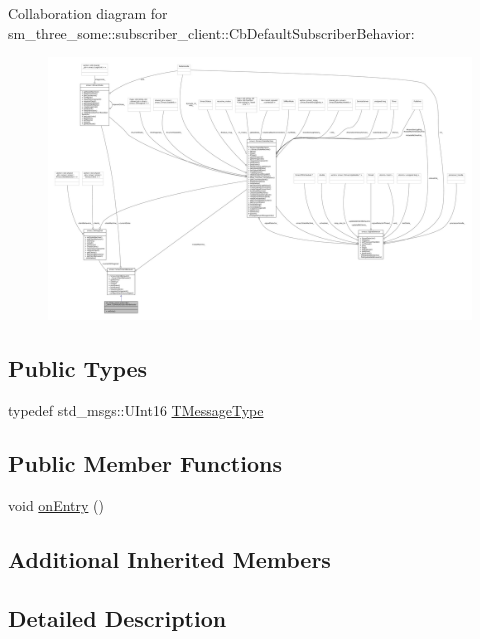 Collaboration diagram for sm\+\_\+three\+\_\+some\+:\+:subscriber\+\_\+client\+:\+:Cb\+Default\+Subscriber\+Behavior\+:
\nopagebreak
\begin{figure}[H]
\begin{center}
\leavevmode
\includegraphics[width=350pt]{classsm__three__some_1_1subscriber__client_1_1CbDefaultSubscriberBehavior__coll__graph}
\end{center}
\end{figure}
\subsection*{Public Types}
\begin{DoxyCompactItemize}
\item 
typedef std\+\_\+msgs\+::\+U\+Int16 \hyperlink{classsm__three__some_1_1subscriber__client_1_1CbDefaultSubscriberBehavior_a81ab8a5c2eb07d540063dfec936d949c}{T\+Message\+Type}
\end{DoxyCompactItemize}
\subsection*{Public Member Functions}
\begin{DoxyCompactItemize}
\item 
void \hyperlink{classsm__three__some_1_1subscriber__client_1_1CbDefaultSubscriberBehavior_a04a42608d74a58b79a86cc22a267a8f7}{on\+Entry} ()
\end{DoxyCompactItemize}
\subsection*{Additional Inherited Members}


\subsection{Detailed Description}


